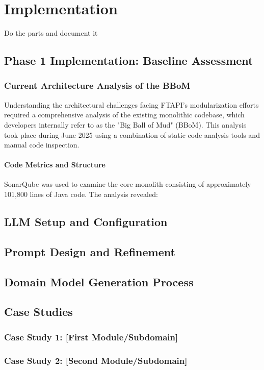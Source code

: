 \chapter{Implementation}
Do the parts and document it 
\section{Phase 1 Implementation: Baseline Assessment}

\subsection{Current Architecture Analysis of the BBoM}
Understanding the architectural challenges facing FTAPI's modularization efforts required a comprehensive analysis of the existing monolithic codebase, which developers internally refer to as the "Big Ball of Mud" (BBoM). This analysis took place during June 2025 using a combination of static code analysis tools and manual code inspection.

\subsubsection{Code Metrics and Structure}
SonarQube was used to examine the core monolith consisting of approximately 101,800 lines of Java code. The analysis revealed:

\section{LLM Setup and Configuration}
\section{Prompt Design and Refinement}
\section{Domain Model Generation Process}
\section{Case Studies}
\subsection{Case Study 1: [First Module/Subdomain]}
\subsection{Case Study 2: [Second Module/Subdomain]}